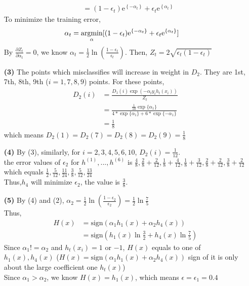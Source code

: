 \documentclass[10pt]{article}
\begin{document}
\begin{enumerate}
$$\begin{aligned}
				\\&=(1-\epsilon_t)\mathrm{e}^{\left\{-\alpha_{t} \right\}}+\epsilon_t\mathrm{e}^{\left\{\alpha_{t} \right\}}
			\end{aligned}
			  $$
			  To minimize the training error,
			  $$
			  \begin{aligned}
				\alpha_t&=\underset{\alpha}{\mathop{\rm argmin}}[(1-\epsilon_t)\mathrm{e}^{\left\{-\alpha_{t} \right\}}+\epsilon_t\mathrm{e}^{\left\{\alpha_{t} \right\}}]
			  \end{aligned}
			  $$
			  By $\frac{\partial Z_t}{\partial \alpha_t}=0$, we know $\alpha_{t}=\frac{1}{2} \ln \left(\frac{1-\epsilon_{t}}{\epsilon_{t}}\right)$.
			  Then, $Z_t=2\sqrt{\epsilon_t(1-\epsilon_t)}$

			\item[\textbf{(3)}]The points which misclassifies will increase in weight in $D_2$. 
			They are 1st, 7th, 8th, 9th ($i=1,7,8,9$) points. For these points,
			  $$
			  \begin{aligned}
				D_{2}(i) &=\frac{D_{1}(i) \exp \left(-\alpha_{t} y_{i} h_{t}\left(x_{i}\right)\right)}{Z_{t}} \\
				&=\frac{\frac{1}{10}\exp \{\alpha_{1}\}}{4 * \exp \{\alpha_{1}\}+6 * \exp \{-\alpha_{1}\}} \\
				&=\frac{1}{8}
			  \end{aligned}
			  $$
			  which means $D_2(1)=D_2(7)=D_2(8)=D_2(9)=\frac{1}{8}$
			\item[\textbf{(4)}]
			  By (3), similarly, for $i=2,3,4,5,6,10$, $D_2(i) = \frac{1}{12}$.
			  \\the error values of $\epsilon_2$ for $h^{(1)},...,h^{(6)}$ is 
			  $\frac{4}{8},\frac{2}{8}+\frac{2}{12},\frac{1}{8}+\frac{4}{12},\frac{1}{8}+\frac{3}{12},\frac{2}{8}+\frac{2}{12},\frac{3}{8}+\frac{2}{12}$
			  which equals $\frac{1}{2},\frac{5}{12},\frac{11}{24},\frac{3}{8},\frac{5}{12},\frac{13}{24}$
			  \\Thus,$h_4$ will minimize $\epsilon_2$, the value is $\frac{3}{8}$.
			  \item[\textbf{(5)}]
			  By (4) and (2), $\alpha_2 = \frac{1}{2} \ln \left(\frac{1-\epsilon_{2}}{\epsilon_{2}}\right)=\frac{1}{2}\ln \frac{7}{5}$
			  \\Thus,
			  $$
			  \begin{aligned}
				H(x)&= \text{sign}(\alpha_{1}h_{1}(x) + \alpha_{2}h_{4}(x))
				\\&=\text{sign}(h_{1}(x)\ln \frac{3}{2} + h_{4}(x)\ln \frac{7}{5})
			  \end{aligned}
			  $$
			  Since $\alpha_1!=\alpha_2$ and $h_t(x_i)=1$ or $-1$, $H(x)$ equals to one of $h_1(x),h_4(x)$
			  ($H(x)= \text{sign}(\alpha_{1}h_{1}(x) + \alpha_{2}h_{4}(x))$ sign of it is only about the large coefficient one $h_t(x)$)
			  \\Since $\alpha_1>\alpha_2$, we know $H(x)=h_1(x)$, which means $\epsilon = \epsilon_1 = 0.4$


\end{enumerate}
\end{document}
